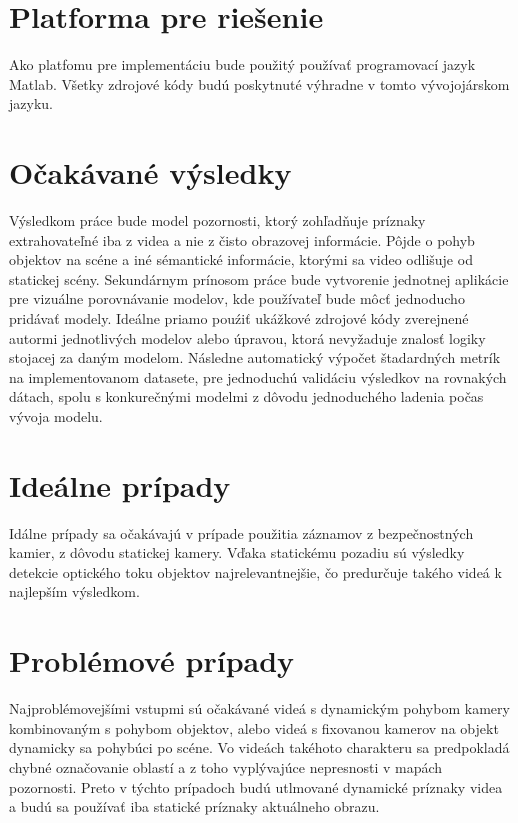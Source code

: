 \section{Platforma pre riešenie}
Ako platfomu pre implementáciu bude použitý používať programovací jazyk Matlab\textregistered.
Všetky zdrojové kódy budú poskytnuté výhradne v tomto vývojojárskom jazyku.
\section{Očakávané výsledky}
Výsledkom práce bude model pozornosti, ktorý zohľadňuje príznaky extrahovateľné iba z videa a nie z čisto obrazovej informácie.
Pôjde o pohyb objektov na scéne a iné sémantické informácie, ktorými sa video odlišuje od statickej scény.
Sekundárnym prínosom práce bude vytvorenie jednotnej aplikácie pre vizuálne porovnávanie modelov, kde používateľ bude môcť jednoducho pridávať modely. Ideálne priamo pouźiť ukážkové zdrojové kódy zverejnené autormi jednotlivých modelov alebo úpravou, ktorá nevyžaduje znalosť logiky stojacej za daným modelom.
Následne automatický výpočet štadardných metrík na implementovanom datasete, pre jednoduchú validáciu výsledkov na rovnakých dátach, spolu s konkurečnými modelmi z dôvodu jednoduchého ladenia počas vývoja modelu.
\section{Ideálne prípady}
Idálne prípady sa očakávajú v prípade použitia záznamov z bezpečnostných kamier, z dôvodu statickej kamery.
Vďaka statickému pozadiu sú výsledky detekcie optického toku objektov najrelevantnejšie, čo predurčuje takého videá k najlepším výsledkom.
\section{Problémové prípady}
Najproblémovejšími vstupmi sú očakávané videá s dynamickým pohybom kamery kombinovaným s pohybom objektov, alebo videá s fixovanou kamerov na objekt dynamicky sa pohybúci po scéne.
Vo videách takéhoto charakteru sa predpokladá chybné označovanie oblastí a z toho vyplývajúce nepresnosti v mapách pozornosti.
Preto v týchto prípadoch budú utlmované dynamické príznaky videa a budú sa používať iba statické príznaky aktuálneho obrazu.
